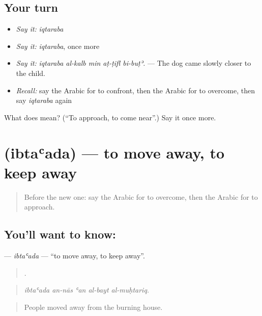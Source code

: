 \subsection*{Your turn}
\begin{itemize}
\raggedright
  \item \emph{Say it:} \emph{iqtaraba}
  \item \emph{Say it:} \emph{iqtaraba}, once more
  \item \emph{Say it:} \emph{iqtaraba al-kalb min aṭ-ṭifl bi-buṭʾ.} — The dog came slowly closer to the child.
  \item \emph{Recall:} say the Arabic for to confront, then the Arabic for to overcome, then say \emph{iqtaraba} again
\end{itemize}

\begin{tcolorbox}[breakable,colback=teal!4,colframe=teal!35!black,title={Before you move on}]
What does  mean? (\textquotedblleft{}To approach, to come near\textquotedblright{}.) Say it once more.
\end{tcolorbox}
\section[\texorpdfstring{\ar{ابتعد} (ibtaʿada)}{ابتعد (ibtaʿada)}]{ (ibtaʿada) — to move away, to keep away}

\label{lesson:AR-C345-ibtaada}



\begin{quote}
Before the new one: say the Arabic for to overcome, then the Arabic for to approach.
\end{quote}

\subsection*{You'll want to know: }
\textbf{} — \emph{ibtaʿada} — \textquotedblleft{}to move away, to keep away\textquotedblright{}.

\begin{quote}
    .
\end{quote}

\begin{quote}
\emph{ibtaʿada an-nās ʿan al-bayt al-muḥtariq.}
\end{quote}

\begin{quote}
People moved away from the burning house.
\end{quote}

